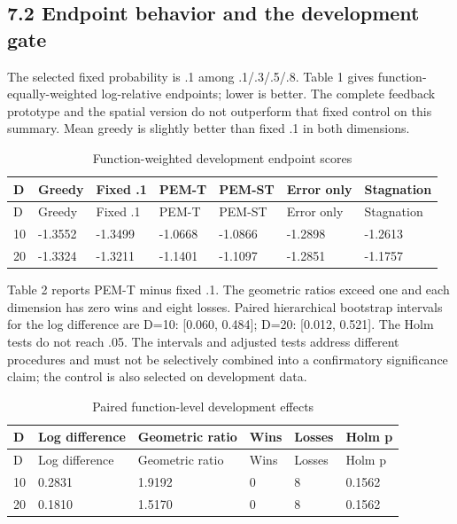 \documentclass[11pt,a4paper]{article}
\begin{document}
\hypertarget{endpoint-behavior-and-the-development-gate}{%
\subsection{7.2 Endpoint behavior and the development
gate}\label{endpoint-behavior-and-the-development-gate}}

The selected fixed probability is .1 among .1/.3/.5/.8. Table 1 gives
function-equally-weighted log-relative endpoints; lower is better. The
complete feedback prototype and the spatial version do not outperform
that fixed control on this summary. Mean greedy is slightly better than
fixed .1 in both dimensions.

\par\noindent\begin{minipage}{\linewidth}

\begin{longtable}[]{@{}lllllll@{}}
\caption{Function-weighted development endpoint scores}\tabularnewline
\toprule
D & Greedy & Fixed .1 & PEM-T & PEM-ST & Error only & Stagnation \\
\midrule
\endfirsthead
\toprule
D & Greedy & Fixed .1 & PEM-T & PEM-ST & Error only & Stagnation \\
\midrule
\endhead
10 & -1.3552 & -1.3499 & -1.0668 & -1.0866 & -1.2898 & -1.2613 \\
20 & -1.3324 & -1.3211 & -1.1401 & -1.1097 & -1.2851 & -1.1757 \\
\bottomrule
\end{longtable}

\end{minipage}\par

Table 2 reports PEM-T minus fixed .1. The geometric ratios exceed one
and each dimension has zero wins and eight losses. Paired hierarchical
bootstrap intervals for the log difference are D=10: {[}0.060, 0.484{]};
D=20: {[}0.012, 0.521{]}. The Holm tests do not reach .05. The intervals
and adjusted tests address different procedures and must not be
selectively combined into a confirmatory significance claim; the control
is also selected on development data.

\par\noindent\begin{minipage}{\linewidth}

\begin{longtable}[]{@{}llllll@{}}
\caption{Paired function-level development effects}\tabularnewline
\toprule
D & Log difference & Geometric ratio & Wins & Losses & Holm p \\
\midrule
\endfirsthead
\toprule
D & Log difference & Geometric ratio & Wins & Losses & Holm p \\
\midrule
\endhead
10 & 0.2831 & 1.9192 & 0 & 8 & 0.1562 \\
20 & 0.1810 & 1.5170 & 0 & 8 & 0.1562 \\
\bottomrule
\end{longtable}

\end{minipage}\par
\end{document}

